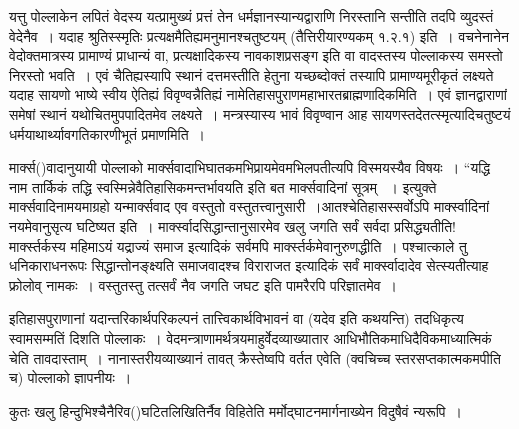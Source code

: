 यत्तु पोल्लाकेन लपितं वेदस्य यत्प्रामुख्यं प्रत्तं तेन धर्मज्ञानस्यान्यद्वाराणि निरस्तानि सन्तीति तदपि व्युदस्तं वेदेनैव~। यदाह श्रुतिस्स्मृतिः
 प्रत्यक्षमैतिह्यमनुमानश्चतुष्टयम् (तैत्तिरीयारण्यकम् १.२.१) इति~। वचनेनानेन वेदोक्तमात्रस्य प्रामाण्यं प्राधान्यं वा, प्रत्यक्षादिकस्य नावकाशप्रसङ्ग इति वा वादस्तस्य पोल्लाकस्य समस्तो निरस्तो भवति~। एवं चैतिह्यस्यापि स्थानं दत्तमस्तीति हेतुना यच्छब्दोक्तं तस्यापि प्रामाण्यमूरीकृतं लक्ष्यते यदाह सायणो भाष्ये स्वीय ऐतिह्यं विवृण्वन्नैतिह्यं नामेतिहासपुराणमहाभारतब्राह्मणादिकमिति~। एवं ज्ञानद्वाराणां समेषां स्थानं यथोचितमुपपादितमेव लक्ष्यते~। मन्त्रस्यास्य भावं विवृण्वान आह सायणस्तदेतत्स्मृत्यादिचतुष्टयं धर्मयाथार्थ्यावगतिकारणीभूतं प्रमाणमिति~।

मार्क्स()वादानुयायी पोल्लाको मार्क्सवादाभिघातकमभिप्रायमेवमभिलपतीत्यपि विस्मयस्यैव विषयः~। “यद्धि नाम तार्किकं तद्धि स्वस्मिन्नेवैतिहासिकमन्तर्भावयति  इति बत मार्क्सवादिनां सूत्रम् ~। इत्युक्ते मार्क्सवादिनामयमाग्रहो यन्मार्क्सवाद एव वस्तुतो वस्तुतत्त्वानुसारी~।\break आतश्चेतिहासस्सर्वोऽपि मार्क्स्वादिनां नयमेवानुसृत्य घटिष्यत इति~। मार्क्स्वादसिद्धान्तानुसारमेव खलु जगति सर्वं सर्वदा प्रसिद्ध्यतीति! मार्क्स्तर्कस्य महिमाऽयं यद्राज्यं समाज इत्यादिकं सर्वमपि मार्क्स्तर्कमेवानुरुणद्धीति~। पश्चात्काले तु धनिकाराधनरूपः  सिद्धान्तो\break नङ्क्ष्यति समाजवादश्च विराराजत इत्यादिकं सर्वं मार्क्स्वादादेव सेत्स्यतीत्याह फ्रोलोव् \break नामकः~। वस्तुतस्तु तत्सर्वं नैव जगति जघट इति पामरैरपि परिज्ञातमेव~।

इतिहासपुराणानां यदान्तरिकार्थपरिकल्पनं तात्त्विकार्थविभावनं वा (यदेव  इति कथयन्ति) तदधिकृत्य स्वामसम्मतिं दिशति पोल्लाकः~। वेदमन्त्राणामर्थत्रयमाहुर्वेदव्याख्यातार आधिभौतिकमाधिदैविकमाध्यात्मिकं चेति तावदास्ताम्~। नानास्तरीयव्याख्यानं तावत् क्रैस्तेष्वपि वर्तत एवेति (क्वचिच्च स्तरसप्तकात्मकमपीति च) पोल्लाको ज्ञापनीयः~।

कुतः खलु हिन्दुभिश्चैनैरिव()घटितलिखितिर्नैव विहितेति मर्मोद्घाटनमार्गनाख्येन विदुषैवं न्यरूपि~।

\begin{myquote}

~\hfill {}
\end{myquote}

